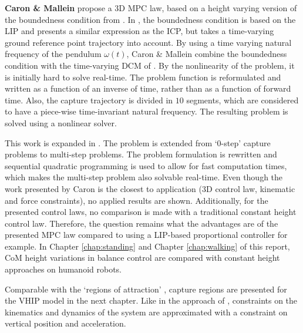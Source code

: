 \textbf{Caron \& Mallein} \cite{caron2018balance} propose a \ac{3D} \ac{MPC} law, based on a height varying version of the boundedness condition from \cite{lanari2014boundedness}. In \cite{lanari2014boundedness}, the boundedness condition is based on the \ac{LIP} and presents a similar expression as the \ac{ICP}, but takes a time-varying ground reference point trajectory into account.  By using a time varying natural frequency of the pendulum $\omega(t)$, Caron \& Mallein \cite{caron2018balance} combine the boundedness condition with the time-varying \ac{DCM} of \cite{hopkins2014humanoid}. By the nonlinearity of the problem, it is initially hard to solve real-time. The problem function is reformulated and written as a function of an inverse of time, rather than as a function of forward time. Also, the capture trajectory is divided in $10$ segments, which are considered to have a piece-wise time-invariant natural frequency. The resulting problem is solved using a nonlinear solver.

This work is expanded in \cite{caron2018capturability}. The problem is extended from `0-step' capture problems to multi-step problems. The problem formulation is rewritten and sequential quadratic programming is used to allow for fast computation times, which makes the multi-step problem also solvable real-time. Even though the work presented by Caron is the closest to application (\ac{3D} control law, kinematic and force constraints), no applied results are shown. Additionally, for the presented control laws, no comparison is made with a traditional constant height control law. Therefore, the question remains what the advantages are of the presented \ac{MPC} law compared to using a \ac{LIP}-based proportional controller for example. In Chapter \ref{chap:standing} and Chapter \ref{chap:walking} of this report, \ac{CoM} height variations in balance control are compared with constant height approaches on humanoid robots.

Comparable with the `regions of attraction' \cite{koolen2016balance}, capture regions are presented for the \ac{VHIP} model in the next chapter. Like in the approach of \cite{caron2018balance,caron2018capturability}, constraints on the kinematics and dynamics of the system are approximated with a constraint on vertical position and acceleration.